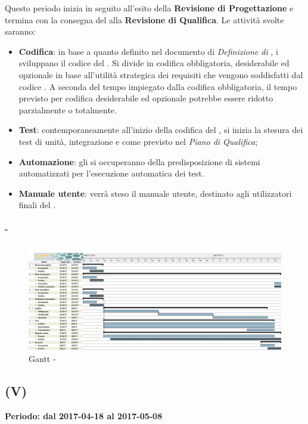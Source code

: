 \documentclass[./PianoDiProgetto.tex]{subfiles}
\begin{document}
  Questo periodo inizia in seguito all'esito della \textbf{Revisione di Progettazione} e termina con la consegna del  alla \textbf{Revisione di Qualifica}. Le attività svolte saranno:
  \begin{itemize}
    \item \textbf{Codifica}: in base a quanto definito nel documento di \textit{Definizione di }, i \PRP{} sviluppano il codice del  . Si divide in codifica obbligatoria, desiderabile ed opzionale in base all'utilità strategica dei requisiti che vengono soddisfatti dal codice . A seconda del tempo impiegato dalla codifica obbligatoria, il tempo previsto per codifica desiderabile ed opzionale potrebbe essere ridotto parzialmente o totalmente.
    \item \textbf{Test}: contemporaneamente all'inizio della codifica del , si inizia la stesura dei test di unità, integrazione e  come previsto nel \textit{Piano di Qualifica};
    \item \textbf{Automazione}: gli \AMMP{} si occuperanno della predisposizione di sistemi automatizzati per l'esecuzione automatica dei test.
    \item \textbf{Manuale utente}: verrà steso il manuale utente, destinato agli utilizzatori finali del .
  \end{itemize}

  \newpage
  \paragraph{ - \PerC}
    \begin{figure}[!h]
    \centering
    \includegraphics[width=\textwidth]{images/C}
    \caption{Gantt - \PerC}
    \end{figure}

  \subsection{\PerV (V)}
  \textbf{Periodo: dal 2017-04-18 al 2017-05-08}
\end{document}
